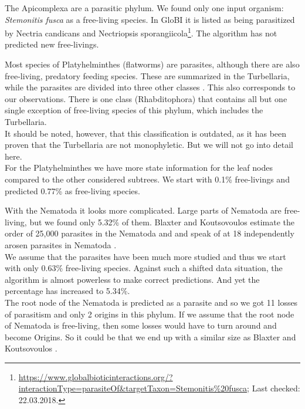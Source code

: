     The Apicomplexa are a parasitic phylum. We found only one input organism: \textit{Stemonitis fusca} 
      as a free-living species. In GloBI it is listed as being parasitized by Nectria candicans and 
      Nectriopsis sporangiicola\footnote{
        \hyperlink{https://www.globalbioticinteractions.org/?interactionType=parasiteOf&targetTaxon=Stemonitis\%20fusca}
        {https://www.globalbioticinteractions.org/?interactionType=parasiteOf\&targetTaxon=Stemonitis\%20fusca};
        Last checked: 22.03.2018.
      }. The algorithm has not predicted new free-livings.

    Most species of Platyhelminthes (flatworms) are parasites, although there are also free-living, 
      predatory feeding species. These are summarized in the Turbellaria, while the parasites are 
      divided into three other classes \cite{Ax1961}. This also corresponds to our observations. There 
      is one class (Rhabditophora) that contains all but one single exception of free-living species 
      of this phylum, which includes the Turbellaria. \\
    It should be noted, however, that this classification is outdated, as it has been proven that 
      the Turbellaria are not monophyletic. But we will not go into detail here. \\
    For the Platyhelminthes we have more state information for the leaf nodes compared to the other 
      considered subtrees. We start with 0.1\% free-livings and predicted 0.77\% as free-living 
      species.

    With the Nematoda it looks more complicated. Large parts of Nematoda are free-living, but we 
      found only 5.32\% of them. Blaxter and Koutsovoulos estimate the order of 25,000 parasites in 
      the Nematoda and and speak of at 18 independently arosen parasites in Nematoda 
      \cite{Blaxter2015}. \\
    We assume that the parasites have been much more studied and thus we start with only 0.63\% 
      free-living species. Against such a shifted data situation, the algorithm is almost powerless to 
      make correct predictions. And yet the percentage has increased to 5.34\%. \\
    The root node of the Nematoda is predicted as a parasite and so we got 11 losses of parasitism 
      and only 2 origins in this phylum. If we assume that the root node of Nematoda is free-living, 
      then some losses would have to turn around and become Origins. So it could be that we end up 
      with a similar size as Blaxter and Koutsovoulos \cite{Blaxter2015}.

